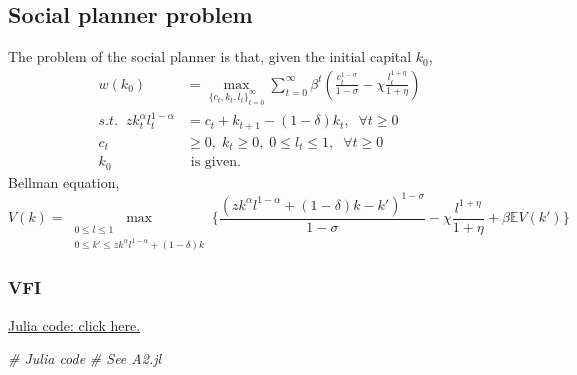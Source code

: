 \documentclass[]{article}
\newenvironment{Shaded}{\begin{snugshade}}{\end{snugshade}}
\newcommand{\CommentTok}[1]{\textcolor[rgb]{0.56,0.35,0.01}{\textit{#1}}}
\begin{document}
        \subsection{Social planner problem}
            The problem of the social planner is that, given the initial capital $k_0$,
            \begin{equation}\label{SPP1}
                \begin{split}
                    w( k_0)&=\max_{\{c_t, k_t, l_t \}_{t=0}^{\infty}}
                    \sum_{t=0}^{\infty}
                    \beta ^t(\frac{c_t^{1-\sigma}}{1-\sigma}-\chi \frac{l_t^{1+\eta}}{1+\eta})\\
                    s.t. \;\;zk_t^{\alpha}l_t^{1-\alpha}&=c_t+k_{t+1}-(1-\delta)k_t, \;\;\forall t\geq 0\\
                    c_t&\geq0,\;k_t\geq0,\;0\leq l_t\leq 1,  \;\;\forall t\geq 0\\
                    k_0&\text{ is given.}
                \end{split}
            \end{equation}
            Bellman equation,
            \begin{equation}
                V(k)=\max_{\begin{smallmatrix}0\leq l\leq 1
                    \\0\leq k'\leq zk^{\alpha}l^{1-\alpha}+(1-\delta)k\end{smallmatrix}}
                    \{\frac{(zk^{\alpha}l^{1-\alpha}+(1-\delta)k-k')^{1-\sigma}}{1-\sigma}-\chi \frac{l^{1+\eta}}{1+\eta}+\beta \mathbb{E}V(k')\}
            \end{equation}

\hypertarget{vfi}{%
\subsubsection{VFI}\label{vfi}}

\href{https://github.com/hans-mtz/AdvMacro/blob/master/A2.jl}{Julia
code: click here.}

\begin{Shaded}
\begin{Highlighting}[]
\CommentTok{# Julia code}
\CommentTok{# See A2.jl}
\end{Highlighting}
\end{Shaded}
\end{document}
